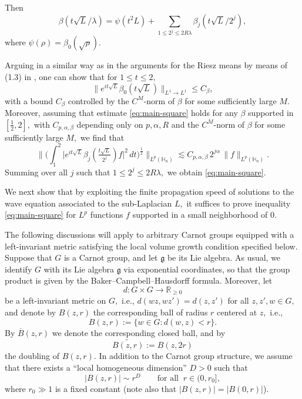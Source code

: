\documentclass[leqno]{amsart}
\theoremstyle{definition}
\theoremstyle{remark}
\numberwithin{equation}{section}
\newcommand{\R}{\mathbb{R}}
\newcommand\la{{\lambda}}
\newcommand\bbH{{\mathbb {H}}}
\begin{document}
Then 
$$\beta(t\sqrt{L}/\la)=\psi (t^2L)+\sum_{1\le 2^j\le 2R\la} \beta_j(t\sqrt{L}/2^j),
$$
where $\psi(\rho)=\beta_0(\sqrt{\rho}).$


Arguing in a similar way as in the arguments for the Riesz means 
by means of (1.3) in \cite{MuellerStein-mult}, one can  show that for $1\le t\le 2,$
\[
\|e^{it \sqrt{L}} \beta_0(t\sqrt{L})  \|_{L^1\to L^1} \le C_\beta,
\]
with a bound  $C_\beta$ controlled by the $C^M$-norm of $\beta$ for some sufficiently large $M.$ 
Moreover, assuming that estimate \eqref{eq:main-square} holds for any  $\beta$ supported in $[\frac{1}{2},2],$ with
$C_{p,\alpha, \beta}$ depending only on $p,\alpha, R$ and the $C^M$-norm of $\beta$ for some sufficiently large $M,$ 
we find that 
$$\Big\| \Big( \int_1^2 \big| e^{it \sqrt{L}} \beta_j(\tfrac{t\sqrt{L}}{2^j}) f \big|^2 \, dt \Big)^{\frac 12} \Big\|_{L^p(\bbH_n)} \lesssim C_{p,\alpha,\beta} \, 2^{j\alpha} \, \|f\|_{L^p(\bbH_n)}.
$$
Summing over all $j$ such that $1\le 2^j\le 2R\la,$ we obtain  \eqref{eq:main-square}. 

\medskip

We next show that by exploiting the finite propagation speed of solutions to the wave equation associated to the sub-Laplacian $L,$  it suffices to prove inequality \eqref{eq:main-square}  for $L^p$ functions $f$ supported in a small neighborhood of $0$. 

\medskip

The following discussions will apply to arbitrary Carnot groups equipped with a left-invariant metric satisfying the local volume growth condition specified below. Suppose that $G$ is a Carnot group, and let $\mathfrak g$ be  its Lie algebra. As usual, we identify $G$ with its Lie algebra $\mathfrak{g}$ via exponential coordinates, so that the group product is given by the Baker--Campbell--Hausdorff formula. Moreover, let
\[
d:G\times G\to \R_{\ge 0}
\]
be a left-invariant metric on $G,$ i.e., $d(wz,wz')=d(z,z')$  for all $z,z',w\in G,$ and denote by $B(z,r)$ the corresponding  
ball of radius $r$ centered at $z,$ i.e.,
\[
B(z,r):=\{w\in G: d(w,z)<r\}.
\]
By $\overline B(z,r)$ we denote the corresponding closed ball, and by $$\widetilde{B(z,r)}:=B(z,2r)$$ the doubling of $B(z,r)$. In addition to the Carnot group structure, we assume that there exists a ``local homogeneous dimension'' $D>0$ such that
\begin{equation}\label{locdim}
|B(z,r)|\sim r^D \qquad \text{for all } \  r\in (0,r_0],
\end{equation}
where $r_0\gg 1$ is a fixed constant (note also that $|B(z,r)|=|B(0,r)|$).
\end{document}
